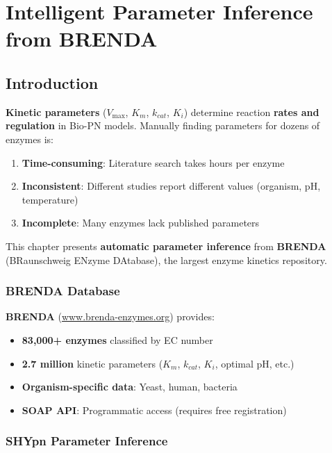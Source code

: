 \chapter{Intelligent Parameter Inference from BRENDA}
\label{ch:brenda}

\section{Introduction}
\label{sec:brenda-intro}

\textbf{Kinetic parameters} ($V_{\max}$, $K_m$, $k_{cat}$, $K_i$) determine reaction \textbf{rates and regulation} in Bio-PN models. Manually finding parameters for dozens of enzymes is:

\begin{enumerate}
    \item \textbf{Time-consuming}: Literature search takes hours per enzyme
    \item \textbf{Inconsistent}: Different studies report different values (organism, pH, temperature)
    \item \textbf{Incomplete}: Many enzymes lack published parameters
\end{enumerate}

This chapter presents \textbf{automatic parameter inference} from \textbf{BRENDA} (BRaunschweig ENzyme DAtabase), the largest enzyme kinetics repository.

\subsection{BRENDA Database}
\label{subsec:brenda-database}

\textbf{BRENDA} (\url{www.brenda-enzymes.org}) provides:

\begin{itemize}
    \item \textbf{83,000+ enzymes} classified by EC number
    \item \textbf{2.7 million} kinetic parameters ($K_m$, $k_{cat}$, $K_i$, optimal pH, etc.)
    \item \textbf{Organism-specific data}: Yeast, human, bacteria
    \item \textbf{SOAP API}: Programmatic access (requires free registration)
\end{itemize}

\subsection{SHYpn Parameter Inference}
\label{subsec:shypn-parameter-inference}

